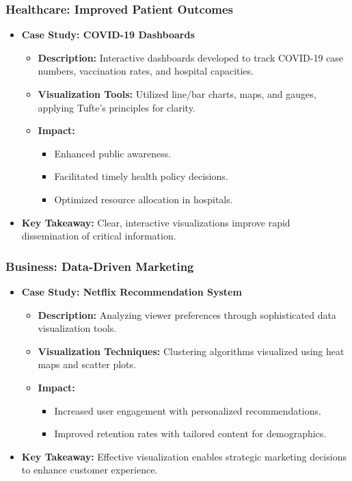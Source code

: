 \documentclass[aspectratio=169]{beamer}
\begin{document}
\begin{frame}[fragile]
    \frametitle{Healthcare: Improved Patient Outcomes}
    \begin{itemize}
        \item \textbf{Case Study: COVID-19 Dashboards}
        \begin{itemize}
            \item \textbf{Description:} Interactive dashboards developed to track COVID-19 case numbers, vaccination rates, and hospital capacities.
            \item \textbf{Visualization Tools:} Utilized line/bar charts, maps, and gauges, applying Tufte's principles for clarity.
            \item \textbf{Impact:}
            \begin{itemize}
                \item Enhanced public awareness.
                \item Facilitated timely health policy decisions.
                \item Optimized resource allocation in hospitals.
            \end{itemize}
        \end{itemize}
        \item \textbf{Key Takeaway:} Clear, interactive visualizations improve rapid dissemination of critical information.
    \end{itemize}
\end{frame}

\begin{frame}[fragile]
    \frametitle{Business: Data-Driven Marketing}
    \begin{itemize}
        \item \textbf{Case Study: Netflix Recommendation System}
        \begin{itemize}
            \item \textbf{Description:} Analyzing viewer preferences through sophisticated data visualization tools.
            \item \textbf{Visualization Techniques:} Clustering algorithms visualized using heat maps and scatter plots.
            \item \textbf{Impact:}
            \begin{itemize}
                \item Increased user engagement with personalized recommendations.
                \item Improved retention rates with tailored content for demographics.
            \end{itemize}
        \end{itemize}
        \item \textbf{Key Takeaway:} Effective visualization enables strategic marketing decisions to enhance customer experience.
    \end{itemize}
\end{frame}
\end{document}
